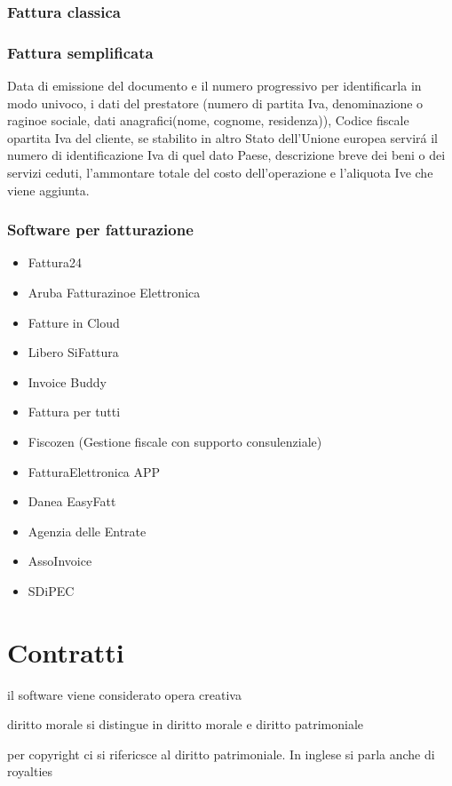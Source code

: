 \documentclass{article}
\begin{document}
\subsubsection{Fattura classica}

\subsubsection{Fattura semplificata}
Data di emissione del documento e il numero progressivo per identificarla in modo univoco, i dati del prestatore (numero di partita Iva, denominazione o raginoe sociale, dati anagrafici(nome, cognome, residenza)), Codice fiscale opartita Iva del cliente, se stabilito in altro Stato dell'Unione europea servir\'a il numero di identificazione Iva di quel dato Paese, descrizione breve dei beni o dei servizi ceduti, l'ammontare totale del costo dell'operazione e l'aliquota Ive che viene aggiunta. 

\subsubsection{Software per fatturazione}
\begin{itemize}
    \item Fattura24
    \item Aruba Fatturazinoe Elettronica
    \item Fatture in Cloud
    \item Libero SiFattura
    \item Invoice Buddy
    \item Fattura per tutti
    \item Fiscozen (Gestione fiscale con supporto consulenziale)
    \item FatturaElettronica APP
    \item Danea EasyFatt
    \item Agenzia delle Entrate
    \item AssoInvoice
    \item SDiPEC
\end{itemize}

\section{Contratti}

il software viene considerato opera creativa

diritto morale si distingue in diritto morale e diritto patrimoniale

per copyright ci si rifericsce al diritto patrimoniale. In inglese si parla anche di royalties
\end{document}
